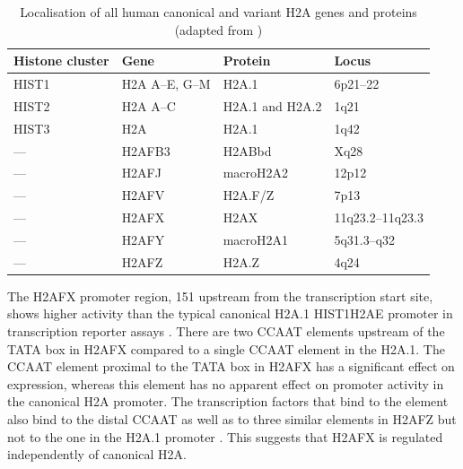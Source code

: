 \begin{table}
\centering
\caption[Localisation of all human canonical and variant H2A genes and
         proteins]%
        {Localisation of all human canonical and variant H2A genes and
          proteins (adapted from \citet{WFM+02})}
\label{tab:h2ax-review:H2A-localisation}
\begin{tabular}{l l l l}
\toprule
Histone cluster & Gene & Protein & Locus  \\
\midrule
HIST1 & H2A A--E, G--M  & H2A.1           & 6p21--22\\
HIST2 & H2A A--C        & H2A.1 and H2A.2 & 1q21\\
HIST3 & H2A             & H2A.1           & 1q42\\
---   & H2AFB3          & H2ABbd          & Xq28\\
---   & H2AFJ           & macroH2A2       & 12p12\\
---   & H2AFV           & H2A.F/Z         & 7p13\\
---   & H2AFX           & H2AX            & 11q23.2--11q23.3\\
---   & H2AFY           & macroH2A1       & 5q31.3--q32\\
---   & H2AFZ           & H2A.Z           & 4q24\\
\bottomrule
\end{tabular}
\end{table}

The H2AFX promoter region, \SI{151}{\bp} upstream from the
transcription start site, shows higher activity than the typical
canonical H2A.1 HIST1H2AE promoter in transcription reporter assays
\citep{VSI94}.  There are two CCAAT elements upstream of the TATA box
in H2AFX  compared to a single CCAAT
element in the H2A.1. The CCAAT element proximal to the TATA box in
H2AFX has a significant effect on expression, whereas this element has
no apparent effect on promoter activity in the canonical H2A
promoter. The transcription factors that bind to the element also bind
to the distal CCAAT as well as to three similar elements in H2AFZ but
not to the one in the H2A.1 promoter \citep{VSI94}.
This suggests that H2AFX is regulated independently of canonical H2A.

